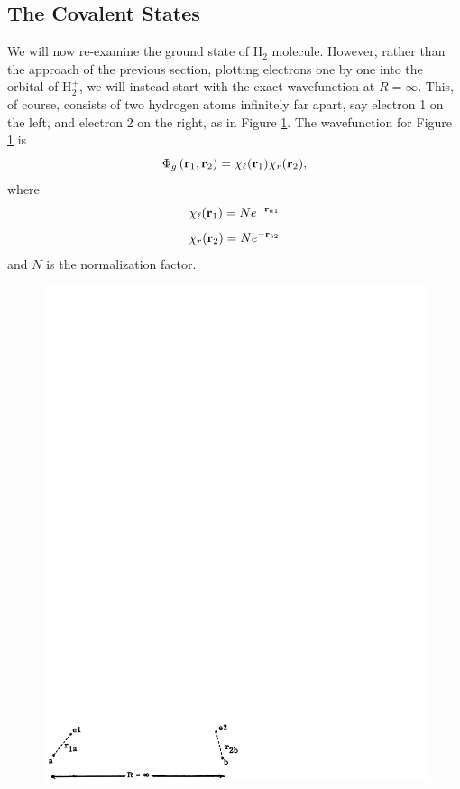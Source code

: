 \subsection{The Covalent States}
    
We will now re-examine the ground state of H$_2$ molecule. However,
rather than the approach of the previous section, plotting electrons
one by one into the orbital of H$^+_2$, we will instead start with the
exact wavefunction at $R = \infty$. This, of course, consists of two
hydrogen atoms infinitely far apart, say electron 1 on the left, and
electron 2 on the right, as in Figure \ref{fig2-24}. The wavefunction
for Figure \ref{fig2-24} is
\begin{equation}
\Phi_g \left( {\bf r}_1 , {\bf r}_2 \right) = \chi_\ell ( {\bf r}_1 ) 
\chi_r ( {\bf r}_2),
\label{eqno2-37}
\end{equation}
where
\begin{equation}
\chi_\ell ( {\bf r}_1 ) = Ne^{-{\bf r}_{a1}}
\label{eqno2-38a}
\end{equation}
\begin{equation}
\chi_r( {\bf r}_2) = Ne^{- {\bf r}_{b2}}
\label{eqno2-38b}
\end{equation}
and $N$ is the normalization factor.

\begin{figure}
\begin{center}
\includegraphics[scale=0.75]{fig2-24}
\end{center}
\caption{}
\label{fig2-24}
\end{figure}
    
